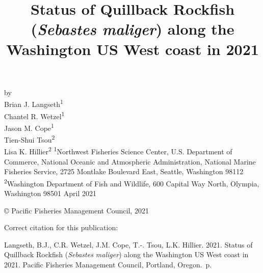 \documentclass[11pt,
  english,
  a4paper,
]{article}
\date{}
\newcommand{\trTitle}{Status of Quillback Rockfish (\emph{Sebastes maliger}) along the Washington US West coast in 2021}
\newcommand{\trYear}{2021}
\newcommand{\trMonth}{April}
\newcommand{\trAuthsBack}{Langseth, B.J., C.R. Wetzel, J.M. Cope, T.-. Tsou, L.K. Hillier}
\newcommand{\trCitation}{
\begin{hangparas}{1em}{1}
\trAuthsBack{}. \trYear{}. \trTitle{}. Pacific Fisheries Management Council, Portland, Oregon. \pageref{LastPage}{}\,p.
\end{hangparas}}
\begin{document}

\renewcommand*{\thefootnote}{\fnsymbol{footnote}}

\small
\thispagestyle{empty}
\noindent
\begin{center}
\title{Status of Quillback Rockfish (\emph{Sebastes maliger}) along the Washington US West coast in 2021}
\vspace{1.5cm}
{\Large\textbf{}}
\vfill
by\\
Brian J. Langseth\textsuperscript{1}\\
Chantel R. Wetzel\textsuperscript{1}\\
Jason M. Cope\textsuperscript{1}\\
Tien-Shui Tsou\textsuperscript{2}\\
Lisa K. Hillier\textsuperscript{2}\vfill
\textsuperscript{1}Northwest Fisheries Science Center, U.S. Department of Commerce, National Oceanic and Atmospheric Administration, National Marine Fisheries Service, 2725 Montlake Boulevard East, Seattle, Washington 98112\\
\textsuperscript{2}Washington Department of Fish and Wildlife, 600 Capital Way North, Olympia, Washington 98501\vfill
\trMonth{} \trYear{}
\end{center}
\clearpage

\thispagestyle{empty}
\vspace*{\fill}
\begin{center}
\copyright{} Pacific Fisheries Management Council, \trYear{}\\
\end{center}
\par
\bigskip
\noindent
Correct citation for this publication:
\bigskip
\par
\trCitation{}
\clearpage


\tableofcontents\clearpage
\listoffigures \listoftables \clearpage
\label{TRlastRoman}
\clearpage

\newpage
\thispagestyle{empty} %

\pagestyle{plain}  %
\renewcommand*{\thefootnote}{\arabic{footnote}}  %
\setcounter{footnote}{0}  %
\renewcommand{\headrulewidth}{0.5pt}
\renewcommand{\footrulewidth}{0.5pt}
\end{document}
